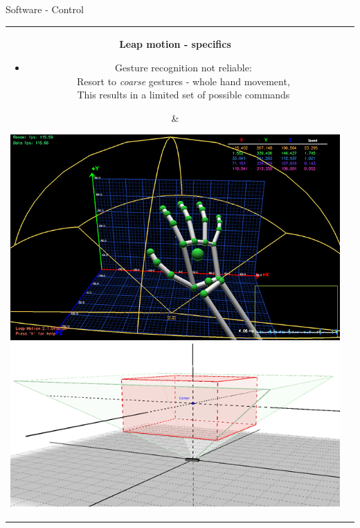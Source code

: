 \documentclass[xcolor=svgnames,handout,aspectratio=169]{beamer}
\begin{document}
\begin{frame}
	{Software - Control}

	\begin{tabular}{cl} 
			\parbox{0.7\linewidth}{
				\textbf{Leap motion - specifics}
				\begin{itemize}
					\item Gesture recognition not reliable:\\
					Resort to \textit{coarse} gestures - whole hand movement,\\
					This results in a limited set of possible commands
				\end{itemize}
				
			}&
			\parbox{0.25\linewidth}{			
				\includegraphics[width=\linewidth]{images/leap_visualizer.jpg}\\
				\vspace{5mm}
				\includegraphics[width=\linewidth]{images/Leap_InteractionBox}				
			}
		\end{tabular}
\end{frame}
\end{document}
